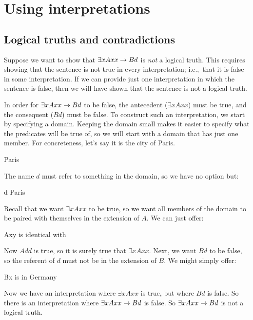 \chapter{Using interpretations}
\label{sec.UsingModels}

\section{Logical truths and contradictions}
Suppose we want to show that $\exists xAxx \rightarrow Bd$ is \emph{not} a logical truth. This requires showing that the sentence is not true in every interpretation; i.e.,\ that it is false in some interpretation. If we can provide just one interpretation in which the sentence is false, then we will have shown that the sentence is not a logical truth.

In order for $\exists xAxx \rightarrow Bd$ to be false, the antecedent ($\exists x Axx$) must be true, and the consequent ($Bd$) must be false. To construct such an interpretation, we start by specifying a domain. Keeping the domain small makes it easier to specify what the predicates will be true of, so we will start with a domain that has just one member. For concreteness, let's say it is the city of Paris. 
	\begin{ekey}
		\item[\text{domain}] Paris
	\end{ekey}
The name $d$ must refer to something in the domain, so we have no option but:
	\begin{ekey}
		\item[d] Paris
	\end{ekey}
Recall that we want $\exists x Axx$ to be true, so we want all members of the domain to be paired with themselves in the extension of $A$. We can just offer:
	\begin{ekey}
		\item[Axy]  is identical with 
	\end{ekey}
Now $Add$ is true, so it is surely true that $\exists x Axx$. Next, we want $Bd$ to be false, so the referent of $d$ must not be in the extension of $B$. We might simply offer:
	\begin{ekey}
		\item[Bx]  is in Germany
	\end{ekey}
Now we have an interpretation where $\exists x Axx$ is true, but where $Bd$ is false. So there is an interpretation where $\exists x Axx \rightarrow Bd$ is false. So $\exists x Axx \rightarrow Bd$ is not a logical truth.


